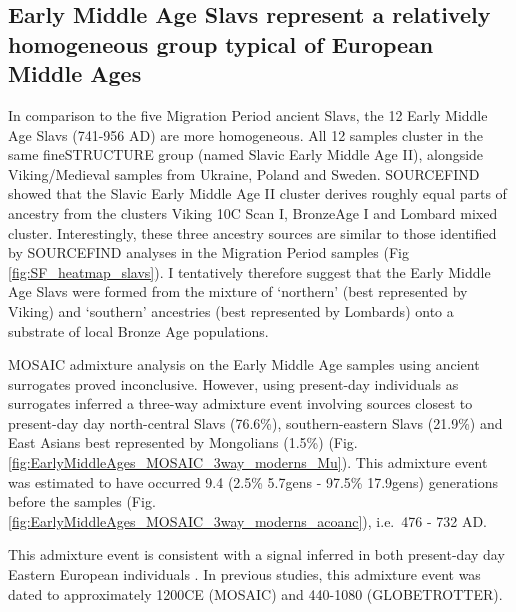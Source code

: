 \subsection{Early Middle Age Slavs represent a relatively homogeneous group typical of European Middle Ages}

In comparison to the five Migration Period ancient Slavs, the 12 Early Middle Age Slavs (741-956 AD) are more homogeneous. All 12 samples cluster in the same fineSTRUCTURE group (named Slavic Early Middle Age II), alongside Viking/Medieval samples from Ukraine, Poland and Sweden. SOURCEFIND showed that the Slavic Early Middle Age II cluster derives roughly equal parts of ancestry from the clusters Viking 10C Scan I, BronzeAge I and Lombard mixed cluster. Interestingly, these three ancestry sources are similar to those identified by SOURCEFIND analyses in the Migration Period samples (Fig \ref{fig:SF_heatmap_slavs}). I tentatively therefore suggest that the Early Middle Age Slavs were formed from the mixture of `northern' (best represented by Viking) and `southern' ancestries (best represented by Lombards) onto a substrate of local Bronze Age populations.

MOSAIC admixture analysis on the Early Middle Age samples using ancient surrogates proved inconclusive. However, using present-day individuals as surrogates inferred a three-way admixture event involving sources closest to present-day day north-central Slavs (76.6\%), southern-eastern Slavs (21.9\%) and East Asians best represented by Mongolians (1.5\%) (Fig. \ref{fig:EarlyMiddleAges_MOSAIC_3way_moderns_Mu}). This admixture event was estimated to have occurred 9.4 (2.5\% 5.7gens - 97.5\% 17.9gens) generations before the samples (Fig. \ref{fig:EarlyMiddleAges_MOSAIC_3way_moderns_acoanc}), i.e.\ 476 - 732 AD. 

This admixture event is consistent with a signal inferred in both present-day day Eastern European individuals \cite{MOSAIC_2019, Hellenthal2014}. In previous studies, this admixture event was dated to approximately 1200CE (MOSAIC) and 440-1080 (GLOBETROTTER).

